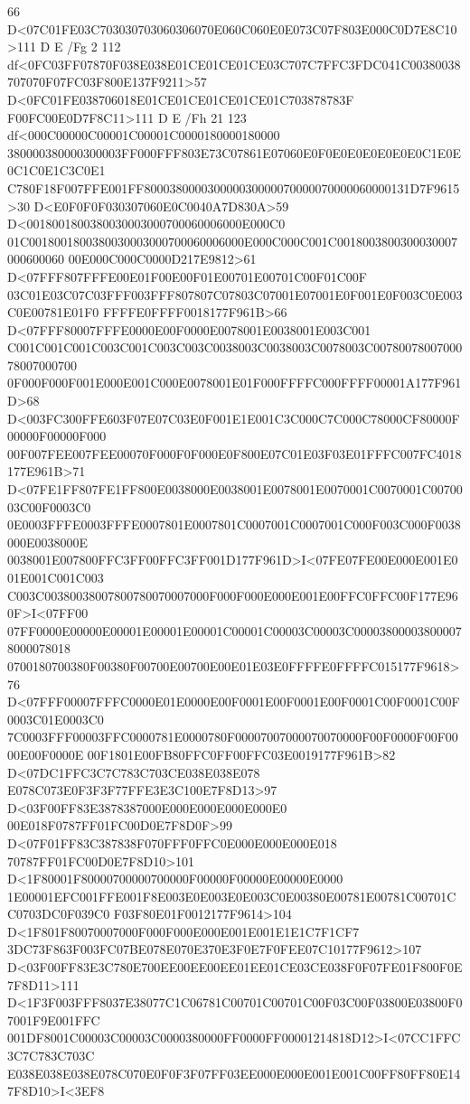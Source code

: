 66 D<07C01FE03C703030703060306070E060C060E0E073C07F803E000C0D7E8C10>111
D E /Fg 2 112 df<0FC03FF07870F038E038E01CE01CE01CE03C707C7FFC3FDC041C00380038
707070F07FC03F800E137F9211>57 D<0FC01FE038706018E01CE01CE01CE01CE01C703878783F
F00FC00E0D7F8C11>111 D E /Fh 21 123 df<000C00000C00001C00001C0000180000180000
380000380000300003FF000FFF803E73C07861E07060E0F0E0E0E0E0E0E0C1E0E0C1C0E1C3C0E1
C780F18F007FFE001FF800038000030000030000070000070000060000131D7F9615>30
D<E0F0F0F030307060E0C0040A7D830A>59 D<0018001800380030003000700060006000E000C0
01C0018001800380030003000700060006000E000C000C001C0018003800300030007000600060
00E000C000C0000D217E9812>61 D<07FFF807FFFE00E01F00E00F01E00701E00701C00F01C00F
03C01E03C07C03FFF003FFF807807C07803C07001E07001E0F001E0F003C0E003C0E00781E01F0
FFFFE0FFFF0018177F961B>66 D<07FFF80007FFFE0000E00F0000E0078001E0038001E003C001
C001C001C001C003C001C003C003C0038003C0038003C0078003C0078007800700078007000700
0F000F000F001E000E001C000E0078001E01F000FFFFC000FFFF00001A177F961D>68
D<003FC300FFE603F07E07C03E0F001E1E001C3C000C7C000C78000CF80000F00000F00000F000
00F007FEE007FEE00070F000F0F000E0F800E07C01E03F03E01FFFC007FC4018177E961B>71
D<07FE1FF807FE1FF800E0038000E0038001E0078001E0070001C0070001C0070003C00F0003C0
0E0003FFFE0003FFFE0007801E0007801C0007001C0007001C000F003C000F0038000E0038000E
0038001E007800FFC3FF00FFC3FF001D177F961D>I<07FE07FE00E000E001E001E001C001C003
C003C00380038007800780070007000F000F000E000E001E00FFC0FFC00F177E960F>I<07FF00
07FF0000E00000E00001E00001E00001C00001C00003C00003C000038000038000078000078018
0700180700380F00380F00700E00700E00E01E03E0FFFFE0FFFFC015177F9618>76
D<07FFF00007FFFC0000E01E0000E00F0001E00F0001E00F0001C00F0001C00F0003C01E0003C0
7C0003FFF00003FFC0000781E0000780F00007007000070070000F00F0000F00F0000E00F0000E
00F1801E00FB80FFC0FF00FFC03E0019177F961B>82 D<07DC1FFC3C7C783C703CE038E038E078
E078C073E0F3F3F77FFE3E3C100E7F8D13>97 D<03F00FF83E3878387000E000E000E000E000E0
00E018F0787FF01FC00D0E7F8D0F>99 D<07F01FF83C387838F070FFF0FFC0E000E000E000E018
70787FF01FC00D0E7F8D10>101 D<1F80001F80000700000700000F00000F00000E00000E0000
1E00001EFC001FFE001F8E003E0E003E0E003C0E00380E00781E00781C00701CC0703DC0F039C0
F03F80E01F0012177F9614>104 D<1F801F80070007000F000F000E000E001E001E1E1C7F1CF7
3DC73F863F003FC07BE078E070E370E3F0E7F0FEE07C10177F9612>107
D<03F00FF83E3C780E700EE00EE00EE01EE01CE03CE038F0F07FE01F800F0E7F8D11>111
D<1F3F003FFF8037E38077C1C06781C00701C00701C00F03C00F03800E03800F07001F9E001FFC
001DF8001C00003C00003C0000380000FF0000FF00001214818D12>I<07CC1FFC3C7C783C703C
E038E038E038E078C070E0F0F3F07FF03EE000E000E001E001C00FF80FF80E147F8D10>I<3EF8
